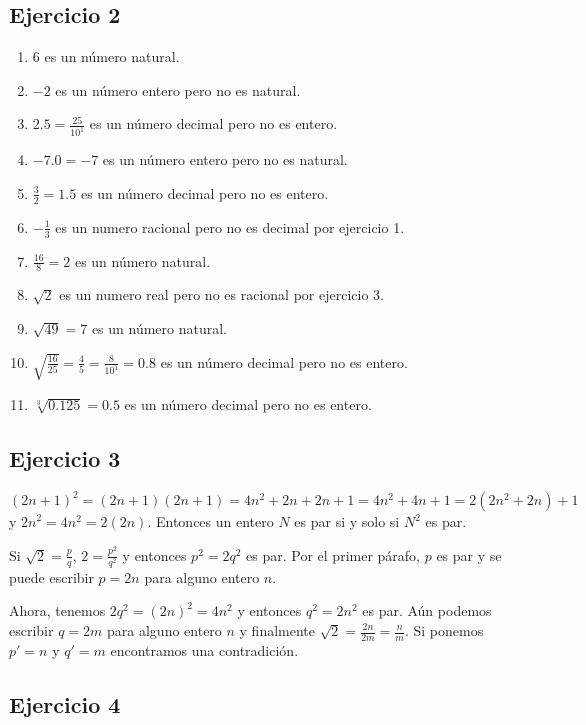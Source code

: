 \subsection*{Ejercicio 2}

\begin{enumerate}
\item $6$ es un número natural.
\item $-2$ es un número entero pero no es natural.
\item $2.5 = \frac{25}{10^1}$ es un número decimal pero no es entero.
\item $-7.0 = -7$ es un número entero pero no es natural.
\item $\frac{3}{2} = 1.5$ es un número decimal pero no es entero.
\item $-\frac{1}{3}$ es un numero racional pero no es decimal por ejercicio 1.
\item $\frac{16}{8} = 2$ es un número natural.
\item $\sqrt{2}$ es un numero real pero no es racional por ejercicio 3.
\item $\sqrt{49} = 7$ es un número natural.
\item $\sqrt{\frac{16}{25}} = \frac{4}{5} = \frac{8}{10^1} = 0.8$ es un número
decimal pero no es entero.
\item $\sqrt[3]{0.125} = 0.5$ es un número decimal pero no es entero.
\end{enumerate}

\subsection*{Ejercicio 3}

${(2n+1)}^2 = {(2n+1)}{(2n+1)} = 4n^2 + 2n + 2n + 1 = 4n^2 + 4n + 1 =
2{(2n^2+2n)} + 1$ y ${2n}^2 = 4n^2 = 2{(2n)}$. Entonces
un entero $N$ es par si y solo si $N^2$ es par.

Si $\sqrt{2} = \frac{p}{q}$, $2 = \frac{p^2}{q^2}$ y entonces
$p^2 = 2q^2$ es par. Por el primer párafo, $p$ es par y se puede escribir
$p = 2n$ para alguno entero $n$.

Ahora, tenemos $2q^2 = {(2n)}^2 = 4n^2$ y entonces $q^2 = 2n^2$ es par.
Aún podemos escribir $q = 2m$ para alguno entero $n$ y finalmente
$\sqrt{2} = \frac{2n}{2m} = \frac{n}{m}$. Si ponemos $p' = n$ y $q' = m$
encontramos una contradición.

\subsection*{Ejercicio 4}

